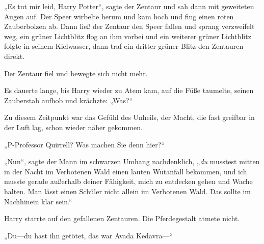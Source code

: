 „Es tut mir leid, Harry Potter“, sagte der Zentaur und sah dann mit geweiteten Augen auf. Der Speer wirbelte herum und kam hoch und fing einen roten Zauberbolzen ab. Dann ließ der Zentaur den Speer fallen und sprang verzweifelt weg, ein grüner Lichtblitz flog an ihm vorbei und ein weiterer grüner Lichtblitz folgte in seinem Kielwasser, dann traf ein dritter grüner Blitz den Zentauren direkt.

Der Zentaur fiel und bewegte sich nicht mehr.

Es dauerte lange, bis Harry wieder zu Atem kam, auf die Füße taumelte, seinen Zauberstab aufhob und krächzte: „Was?“

Zu diesem Zeitpunkt war das Gefühl des Unheils, der Macht, die fast greifbar in der Luft lag, schon wieder näher gekommen.

„P-Professor Quirrell? Was machen Sie denn hier?“

„Nun“, sagte der Mann im schwarzen Umhang nachdenklich, „\emph{du} musstest mitten in der Nacht im Verbotenen Wald einen lauten Wutanfall bekommen, und ich musste gerade außerhalb deiner Fähigkeit, mich zu entdecken gehen und Wache halten. Man lässt einen Schüler nicht allein im Verbotenen Wald. Das sollte im Nachhinein klar sein.“

Harry starrte auf den gefallenen Zentauren. Die Pferdegestalt atmete nicht.

„Du—du hast ihn getötet, das war Avada Kedavra—“

